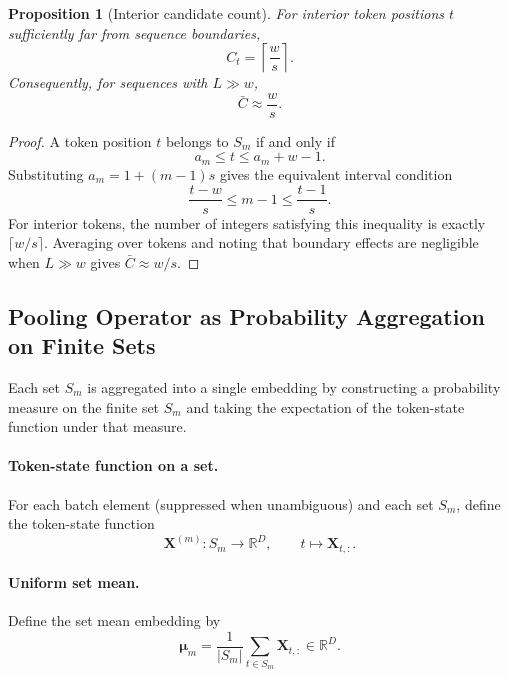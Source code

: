 \documentclass{article}
\theoremstyle{plain}
\newtheorem{proposition}[theorem]{Proposition}
\theoremstyle{definition}
\theoremstyle{remark}
\begin{document}
\begin{proposition}[Interior candidate count]
\label{prop:interior-candidate-count}
For interior token positions $t$ sufficiently far from sequence boundaries,
\begin{equation}
\label{eq:interior-candidate-exact}
C_t=\left\lceil\frac{w}{s}\right\rceil.
\end{equation}
Consequently, for sequences with $L\gg w$,
\begin{equation}
\label{eq:mean-candidate-approx}
\bar C\approx\frac{w}{s}.
\end{equation}
\end{proposition}

\begin{proof}
A token position $t$ belongs to $S_m$ if and only if
\[
a_m\le t\le a_m+w-1.
\]
Substituting $a_m=1+(m-1)s$ gives the equivalent interval condition
\[
\frac{t-w}{s}\le m-1\le \frac{t-1}{s}.
\]
For interior tokens, the number of integers satisfying this inequality is exactly $\lceil w/s\rceil$. Averaging over tokens and noting that boundary effects are negligible when $L\gg w$ gives $\bar C\approx w/s$.
\end{proof}

\subsection{Pooling Operator as Probability Aggregation on Finite Sets}
\label{sec:pooling-operator}

Each set $S_m$ is aggregated into a single embedding by constructing a probability measure on the finite set $S_m$ and taking the expectation of the token-state function under that measure.

\paragraph{Token-state function on a set.}
For each batch element (suppressed when unambiguous) and each set $S_m$, define the token-state function
\begin{equation}
\label{eq:set-token-function}
\mathbf X^{(m)}:S_m\to\mathbb R^D,
\qquad
t\mapsto \mathbf X_{t,:}.
\end{equation}

\paragraph{Uniform set mean.}
Define the set mean embedding by
\begin{equation}
\label{eq:set-mean}
\boldsymbol\mu_m=\frac{1}{|S_m|}\sum_{t\in S_m}\mathbf X_{t,:}
\in\mathbb R^D.
\end{equation}
\end{document}
